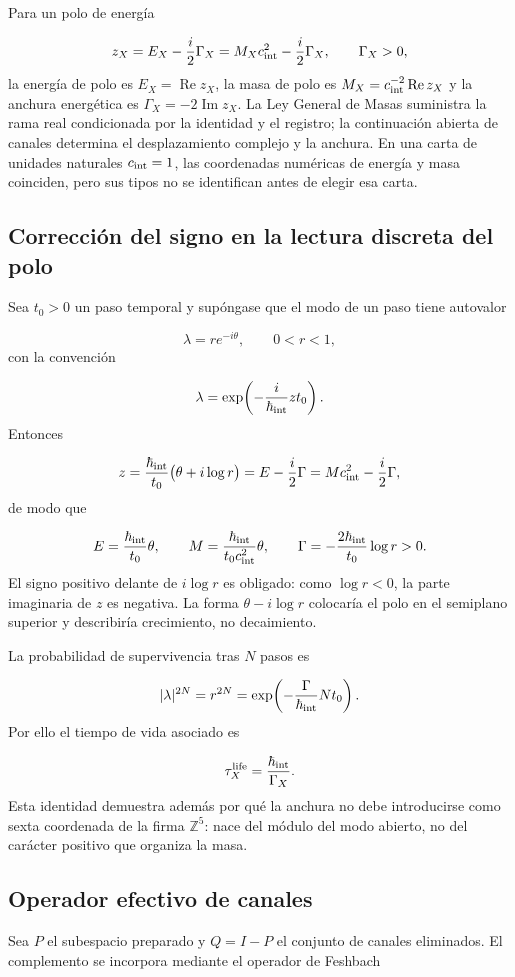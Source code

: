 Para un polo de energía

\[
z_X=E_X-\frac{i}{2}\Gamma_X
=M_Xc_{\rm int}^{2}-\frac{i}{2}\Gamma_X,
\qquad \Gamma_X>0,
\]
la energía de polo es \(E_X=\operatorname{Re}z_X\), la masa de polo es \(M_X=c_{\rm int}^{-2}\operatorname{Re}z_X\) y la anchura energética es \(\Gamma_X=-2\operatorname{Im}z_X\). La Ley General de Masas suministra la rama real condicionada por la identidad y el registro; la continuación abierta de canales determina el desplazamiento complejo y la anchura. En una carta de unidades naturales \(c_{\rm int}=1\), las coordenadas numéricas de energía y masa coinciden, pero sus tipos no se identifican antes de elegir esa carta.

\subsection{Corrección del signo en la lectura discreta del polo}
Sea \(t_0>0\) un paso temporal y supóngase que el modo de un paso tiene autovalor

\[
\lambda=r e^{-i\theta},
\qquad 0<r<1,
\]
con la convención

\[
\lambda=\exp\!\left(-\frac{i}{\hbar_{\rm int}}z t_0\right).
\]
Entonces

\[
z=\frac{\hbar_{\rm int}}{t_0}
\bigl(\theta+i\log r\bigr)
=E-\frac{i}{2}\Gamma
=Mc_{\rm int}^{2}-\frac{i}{2}\Gamma,
\]
de modo que

\[
E=\frac{\hbar_{\rm int}}{t_0}\theta,
\qquad
M=\frac{\hbar_{\rm int}}{t_0c_{\rm int}^{2}}\theta,
\qquad
\Gamma=-\frac{2\hbar_{\rm int}}{t_0}\log r>0.
\]
El signo positivo delante de \(i\log r\) es obligado: como \(\log r<0\), la parte imaginaria de \(z\) es negativa. La forma \(\theta-i\log r\) colocaría el polo en el semiplano superior y describiría crecimiento, no decaimiento.

La probabilidad de supervivencia tras \(N\) pasos es

\[
|\lambda|^{2N}=r^{2N}
=\exp\!\left(-\frac{\Gamma}{\hbar_{\rm int}}Nt_0\right).
\]
Por ello el tiempo de vida asociado es

\[
\tau_X^{\rm life}=\frac{\hbar_{\rm int}}{\Gamma_X}.
\]
Esta identidad demuestra además por qué la anchura no debe introducirse como sexta coordenada de la firma \(\mathbb Z^5\): nace del módulo del modo abierto, no del carácter positivo que organiza la masa.

\subsection{Operador efectivo de canales}
Sea \(P\) el subespacio preparado y \(Q=I-P\) el conjunto de canales eliminados. El complemento se incorpora mediante el operador de Feshbach

